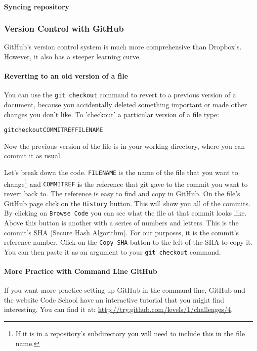 \paragraph{Syncing repository}

\subsubsection{Version Control with GitHub}

GitHub's version control system is much more comprehensive than Dropbox's. However, it also has a steeper learning curve.

\paragraph{Reverting to an old version of a file}

You can use the {\tt{git checkout}} command to revert to a previous version of a document, because you accidentally deleted something important or made other changes you don't like. To 'checkout' a particular version of a file type:

\begin{knitrout}
\color{fgcolor}\begin{kframe}
\begin{alltt}
git checkout COMMITREF FILENAME
\end{alltt}
\end{kframe}
\end{knitrout}


\noindent Now the previous version of the file is in your working directory, where you can commit it as usual.

Let's break down the code.  {\tt{FILENAME}} is the name of the file that you want to change\footnote{If it is in a repository's subdirectory you will need to include this in the file name.} and {\tt{COMMITREF}} is the reference that git gave to the commit you want to revert back to. The reference is easy to find and copy in GitHub. On the file's GitHub page click on the {\tt{History}} button. This will show you all of the commits. By clicking on {\tt{Browse Code}} you can see what the file at that commit looks like. Above this button is another with a series of numbers and letters. This is the commit's SHA (Secure Hash Algorithm). For our purposes, it is the commit's reference number. Click on the {\tt{Copy SHA}} button to the left of the SHA to copy it. You can then paste it as an argument to your {\tt{git checkout}} command. 

\paragraph{More Practice with Command Line GitHub}

If you want more practice setting up GitHub in the command line, GitHub and the website Code School have an interactive tutorial that you might find interesting. You can find it at: \url{http://try.github.com/levels/1/challenges/4}.
